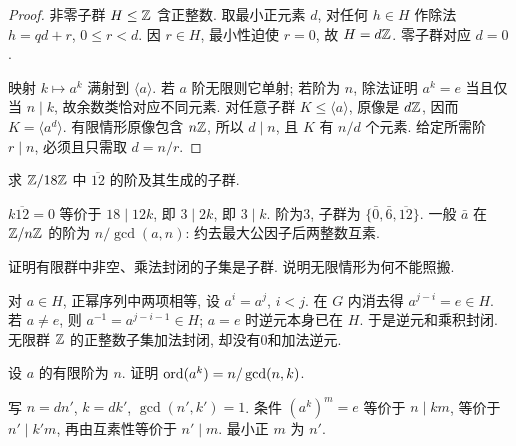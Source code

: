 \begin{proof}
非零子群 $H\le\mathbb Z$ 含正整数. 取最小正元素 $d$, 对任何 $h\in H$ 作除法 $h=qd+r$, $0\le r<d$. 因 $r\in H$, 最小性迫使 $r=0$, 故 $H=d\mathbb Z$. 零子群对应 $d=0$.

映射 $k\mapsto a^k$ 满射到 $\langle a\rangle$. 若 $a$ 阶无限则它单射; 若阶为 $n$, 除法证明 $a^k=e$ 当且仅当 $n\mid k$, 故余数类恰对应不同元素. 对任意子群 $K\le\langle a\rangle$, 原像是 $d\mathbb Z$, 因而 $K=\langle a^d\rangle$. 有限情形原像包含 $n\mathbb Z$, 所以 $d\mid n$, 且 $K$ 有 $n/d$ 个元素. 给定所需阶 $r\mid n$, 必须且只需取 $d=n/r$.
\end{proof}
\begin{example}
求 $\mathbb Z/18\mathbb Z$ 中 $\overline{12}$ 的阶及其生成的子群.
\end{example}
\begin{solution}
$k\overline{12}=0$ 等价于 $18\mid12k$, 即 $3\mid2k$, 即 $3\mid k$. 阶为3, 子群为 $\{\bar0,\bar6,\overline{12}\}$. 一般 $\bar a$ 在 $\mathbb Z/n\mathbb Z$ 的阶为 $n/\gcd(a,n)$: 约去最大公因子后两整数互素.
\end{solution}
\begin{exercise}证明有限群中非空、乘法封闭的子集是子群. 说明无限情形为何不能照搬.\end{exercise}
\begin{solution}
对 $a\in H$, 正幂序列中两项相等, 设 $a^i=a^j$, $i<j$. 在 $G$ 内消去得 $a^{j-i}=e\in H$. 若 $a\ne e$, 则 $a^{-1}=a^{j-i-1}\in H$; $a=e$ 时逆元本身已在 $H$. 于是逆元和乘积封闭. 无限群 $\mathbb Z$ 的正整数子集加法封闭, 却没有0和加法逆元.
\end{solution}
\begin{exercise}设 $a$ 的有限阶为 $n$. 证明 $\operatorname{ord}(a^k)=n/\gcd(n,k)$.\end{exercise}
\begin{solution}
写 $n=dn'$, $k=dk'$, $\gcd(n',k')=1$. 条件 $(a^k)^m=e$ 等价于 $n\mid km$, 等价于 $n'\mid k'm$, 再由互素性等价于 $n'\mid m$. 最小正 $m$ 为 $n'$.
\end{solution}
